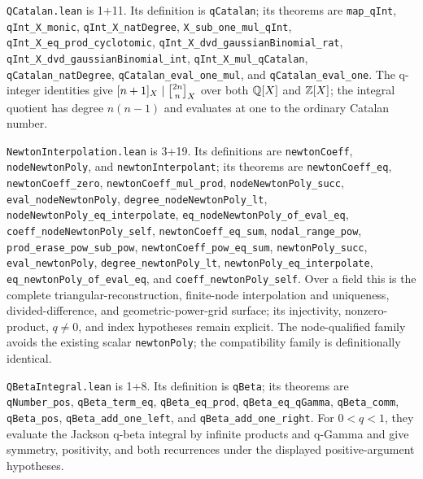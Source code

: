 \documentclass[11pt,oneside]{article}
\theoremstyle{definition}
\theoremstyle{remark}
\begin{document}
\nolinkurl{QCatalan.lean} is 1+11.  Its definition is
\nolinkurl{qCatalan}; its theorems are \nolinkurl{map_qInt},
\nolinkurl{qInt_X_monic}, \nolinkurl{qInt_X_natDegree},
\nolinkurl{X_sub_one_mul_qInt}, \nolinkurl{qInt_X_eq_prod_cyclotomic},
\nolinkurl{qInt_X_dvd_gaussianBinomial_rat},
\nolinkurl{qInt_X_dvd_gaussianBinomial_int},
\nolinkurl{qInt_X_mul_qCatalan}, \nolinkurl{qCatalan_natDegree},
\nolinkurl{qCatalan_eval_one_mul}, and \nolinkurl{qCatalan_eval_one}.
The q-integer identities give \([n+1]_X\mid\GaussianBinomial{2n}{n}{X}\)
over both \(\mathbb{Q}[X]\) and \(\mathbb{Z}[X]\); the integral quotient
has degree \(n(n-1)\) and evaluates at one to the ordinary Catalan number.

\nolinkurl{NewtonInterpolation.lean} is 3+19.  Its definitions are
\nolinkurl{newtonCoeff}, \nolinkurl{nodeNewtonPoly}, and
\nolinkurl{newtonInterpolant}; its theorems are
\nolinkurl{newtonCoeff_eq}, \nolinkurl{newtonCoeff_zero},
\nolinkurl{newtonCoeff_mul_prod}, \nolinkurl{nodeNewtonPoly_succ},
\nolinkurl{eval_nodeNewtonPoly}, \nolinkurl{degree_nodeNewtonPoly_lt},
\nolinkurl{nodeNewtonPoly_eq_interpolate},
\nolinkurl{eq_nodeNewtonPoly_of_eval_eq},
\nolinkurl{coeff_nodeNewtonPoly_self}, \nolinkurl{newtonCoeff_eq_sum},
\nolinkurl{nodal_range_pow}, \nolinkurl{prod_erase_pow_sub_pow},
\nolinkurl{newtonCoeff_pow_eq_sum}, \nolinkurl{newtonPoly_succ},
\nolinkurl{eval_newtonPoly}, \nolinkurl{degree_newtonPoly_lt},
\nolinkurl{newtonPoly_eq_interpolate}, \nolinkurl{eq_newtonPoly_of_eval_eq},
and \nolinkurl{coeff_newtonPoly_self}.  Over a field this is the complete
triangular-reconstruction, finite-node interpolation and uniqueness,
divided-difference, and geometric-power-grid surface; its injectivity,
nonzero-product, \(q\ne0\), and index hypotheses remain explicit.  The
node-qualified family avoids the existing scalar \nolinkurl{newtonPoly}; the
compatibility family is definitionally identical.

\nolinkurl{QBetaIntegral.lean} is 1+8.  Its definition is
\nolinkurl{qBeta}; its theorems are \nolinkurl{qNumber_pos},
\nolinkurl{qBeta_term_eq}, \nolinkurl{qBeta_eq_prod},
\nolinkurl{qBeta_eq_qGamma}, \nolinkurl{qBeta_comm},
\nolinkurl{qBeta_pos}, \nolinkurl{qBeta_add_one_left}, and
\nolinkurl{qBeta_add_one_right}.  For \(0<q<1\), they evaluate the Jackson
q-beta integral by infinite products and q-Gamma and give symmetry,
positivity, and both recurrences under the displayed positive-argument
hypotheses.
\end{document}
